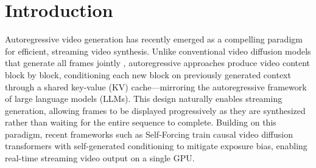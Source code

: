 \documentclass{article} %
\begin{document}

\section{Introduction}

Autoregressive video generation has recently emerged as a compelling paradigm for efficient, streaming video synthesis. Unlike conventional video diffusion models that generate all frames jointly \citep{videoworldsimulators2024,polyak2024movie}, autoregressive approaches produce video content block by block, conditioning each new block on previously generated context through a shared key-value (KV) cache—mirroring the autoregressive framework of large language models (LLMs). This design naturally enables streaming generation, allowing frames to be displayed progressively as they are synthesized rather than waiting for the entire sequence to complete. Building on this paradigm, recent frameworks such as Self-Forcing \citep{huang2025selfforcingbridgingtraintest} train causal video diffusion transformers with self-generated conditioning to mitigate exposure bias, enabling real-time streaming video output on a single GPU.
\end{document}
